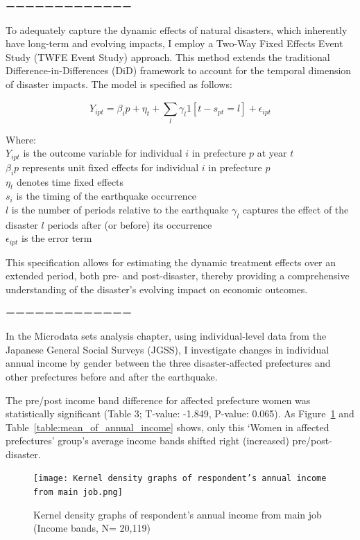 \documentclass[a4paper,12pt]{article}
\begin{document}
ーーーーーーーーーーーーー

To adequately capture the dynamic effects of natural disasters, which inherently have long-term and evolving impacts, I employ a Two-Way Fixed Effects Event Study (TWFE Event Study) approach. This method extends the traditional Difference-in-Differences (DiD) framework to account for the temporal dimension of disaster impacts. The model is specified as follows:

\begin{equation}
Y_{ipt} = \beta_ip + \eta_t + \sum_{l}^{} \gamma_l 1 [t-s_{pt} = l] + \epsilon_{ipt}
\end{equation}

Where: \\
$Y_{ipt}$ is the outcome variable for individual \( i \) in prefecture \( p \) at year \( t \) \\
$\beta_ip$ represents unit fixed effects for individual \( i \) in prefecture \( p \) \\
$\eta_t$ denotes time fixed effects \\
$s_{i}$ is the timing of the earthquake occurrence \\
$l$ is the number of periods relative to the earthquake
$\gamma_l$ captures the effect of the disaster $l$ periods after (or before) its occurrence \\
$\epsilon_{ipt}$ is the error term

This specification allows for estimating the dynamic treatment effects over an extended period, both pre- and post-disaster, thereby providing a comprehensive understanding of the disaster's evolving impact on economic outcomes.

ーーーーーーーーーーーーー

In the Microdata sets analysis chapter, using individual-level data from the Japanese General Social Surveys (JGSS), I investigate changes in individual annual income by gender between the three disaster-affected prefectures and other prefectures before and after the earthquake. 

The pre/post income band difference for affected prefecture women was statistically significant (Table 3; T-value: -1.849, P-value: 0.065). As Figure~\ref{fig:Kernel_density} and Table~\ref{table:mean_of_annual_income} shows, only this ‘Women in affected prefectures’ group's average income bands shifted right (increased) pre/post-disaster.

\begin{figure}[h!]
    \centering
    \texttt{[image: Kernel density graphs of respondent’s annual income from main job.png]}  %
    \caption{Kernel density graphs of respondent’s annual income from main job (Income bands, N= 20,119)}
    \label{fig:Kernel_density}
\end{figure}
\end{document}
